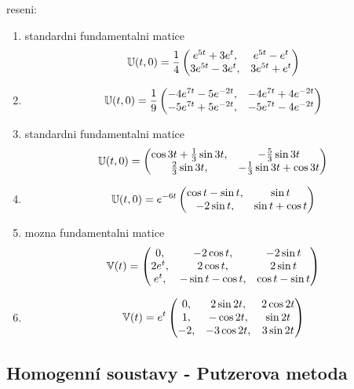 \pagebreak
reseni:
\begin{enumerate}
\item standardni fundamentalni matice
\[
  {\mathbb{U}}(t,0)=\frac14\left(\begin{matrix}
                     e^{5t}+3e^t,&e^{5t}-e^t\\
                     3e^{5t}-3e^t,&3e^{5t}+e^t
                     \end{matrix}\right)
\]
\item
\[
  {\mathbb{U}}(t,0)=\frac19\left(\begin{matrix}
                     -4e^{7t}-5e^{-2t},& -4e^{7t}+4e^{-2t}\\
                     -5e^{7t}+5e^{-2t},&-5e^{7t}-4e^{-2t}
                     \end{matrix}\right)
\]
\item
standardni fundamentalni matice
\[
  {\mathbb{U}}(t,0)=\left(\begin{matrix}
                     \cos3t+\frac13\sin3t,&-\frac53\sin3t\\
                     \frac23\sin3t,&-\frac13\sin3t+\cos3t
                   \end{matrix}\right)
\]
\item
\[
  {\mathbb{U}}(t,0)=e^{-6t}\left(\begin{matrix}
                     \cos t-\sin t,&\sin t\\
                     -2\sin t,&\sin t+\cos t
                   \end{matrix}\right)
\]
\item mozna fundamentalni matice
\[
  {\mathbb{V}}(t)=\left(\begin{matrix}
               0,&-2\cos t,&-2\sin t\\
               2e^t,&2\cos t,&2\sin t\\
               e^t,&-\sin t-\cos t,& \cos t -\sin t
             \end{matrix}\right)
\]
\item
\[
  {\mathbb{V}}(t)=e^t\left(\begin{matrix}
               0,&2\sin 2t,& 2\cos2t\\
               1,&-\cos2t,&\sin2t\\
               -2,&-3\cos2t,&3\sin2t
             \end{matrix}\right)
\]
\end{enumerate}
\subsection{Homogenní soustavy - Putzerova metoda}


